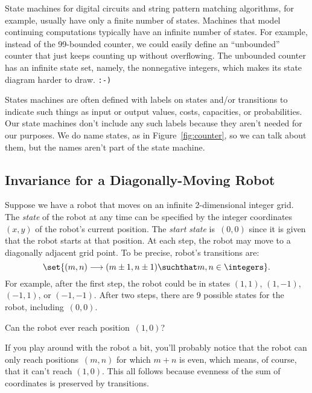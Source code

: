 State machines for digital circuits and string pattern matching
algorithms, for example, usually have only a finite number of states.
Machines that model continuing computations typically have an infinite
number of states.  For example, instead of the 99-bounded counter, we
could easily define an ``unbounded'' counter that just keeps counting up
without overflowing.  The unbounded counter has an infinite state set,
namely, the nonnegative integers, which makes its state diagram harder to
draw. \texttt{:-)}

States machines are often defined with labels on states and/or transitions
to indicate such things as input or output values, costs, capacities, or
probabilities.  Our state machines don't include any such labels because
they aren't needed for our purposes.  We do name states, as in
Figure~\ref{fig:counter}, so we can talk about them, but the names aren't
part of the state machine.

\subsection{Invariance for a Diagonally-Moving Robot}
Suppose we have a robot that moves on an infinite 2-dimensional
integer grid.  The \emph{state} of the robot at any time can be
specified by the integer coordinates $(x, y)$ of the robot's current
position.  The \emph{start state} is~$(0, 0)$ since it is given that
the robot starts at that position.  At each step, the robot may move
to a diagonally adjacent grid point.  To be precise, robot's
transitions are:
\[
\set{(m,n)\movesto (m\pm 1, n\pm 1) \suchthat m,n \in \integers}.
\]
For example, after the first step, the robot could be in states $(1,
1)$, $(1, -1)$, $(-1, 1)$, or $(-1, -1)$.  After two steps, there are
9 possible states for the robot, including~$(0, 0)$.

Can the robot ever reach position~$(1, 0)$?

If you play around with the robot a bit, you'll probably notice that
the robot can only reach positions~$(m, n)$ for which $m + n$ is even,
which means, of course, that it can't reach $(1,0)$.  This all follows
because evenness of the sum of coordinates is preserved by
transitions.

